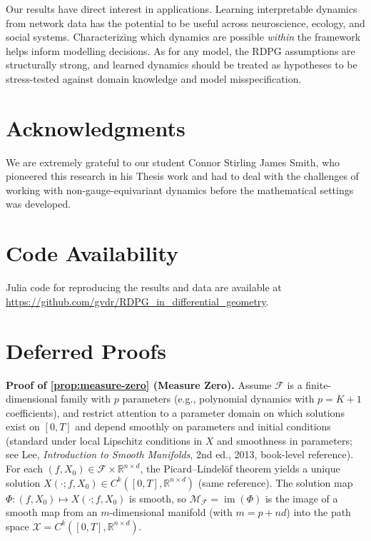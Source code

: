 \documentclass{article}
\newcommand{\RR}{\mathbb{R}}
\DeclareMathOperator{\im}{im}
\theoremstyle{plain}
\theoremstyle{definition}
\theoremstyle{remark}
\begin{document}
Our results have direct interest in applications. Learning interpretable dynamics from network data has the potential to be useful across neuroscience, ecology, and social systems. Characterizing which dynamics are possible \emph{within} the framework helps inform modelling decisions.
As for any model, the RDPG assumptions are structurally strong, and learned dynamics should be treated as hypotheses to be stress-tested against domain knowledge and model misspecification.



\section*{Acknowledgments}

We are extremely grateful to our student Connor Stirling James Smith, who pioneered this research in his Thesis work and had to deal with the challenges of working with non-gauge-equivariant dynamics before the mathematical settings was developed.

\section*{Code Availability}

Julia code for reproducing the results and data are available at \url{https://github.com/gvdr/RDPG_in_differential_geometry}.








\clearpage
\appendix

\section{Deferred Proofs}\label{app:deferred-proofs}

\textbf{Proof of \cref{prop:measure-zero} (Measure Zero).}
Assume $\mathcal{F}$ is a finite-dimensional family with $p$ parameters (e.g., polynomial dynamics with $p = K+1$ coefficients), and restrict attention to a parameter domain on which solutions exist on $[0,T]$ and depend smoothly on parameters and initial conditions (standard under local Lipschitz conditions in $X$ and smoothness in parameters; see Lee, \emph{Introduction to Smooth Manifolds}, 2nd ed., 2013, book-level reference).
For each $(f, X_0) \in \mathcal{F} \times \RR^{n \times d}$, the Picard--Lindel\"of theorem yields a unique solution $X(\cdot; f, X_0) \in C^k([0,T], \RR^{n \times d})$ (same reference).
The solution map $\Phi: (f, X_0) \mapsto X(\cdot; f, X_0)$ is smooth, so $\mathcal{M}_\mathcal{F} = \im(\Phi)$ is the image of a smooth map from an $m$-dimensional manifold (with $m = p + nd$) into the path space $\mathcal{X} = C^k([0,T], \RR^{n \times d})$.
\end{document}
